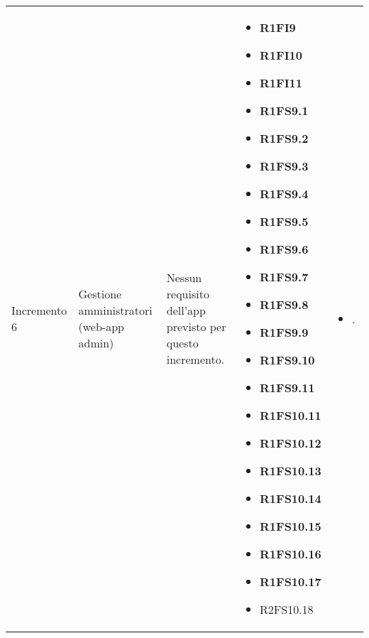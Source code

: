 {\begin{longtable}{C{2.5cm} C{3.2cm} C{2.8cm} C{2.8cm} C{2.8cm}}
Incremento 6 & Gestione amministratori (web-app admin) & 
    Nessun requisito dell'app previsto per questo incremento.
    & \begin{itemize} 
    \item[ ] \textbf{R1FI9}
    \item[ ] \textbf{R1FI10}
    \item[ ] \textbf{R1FI11}
    \item[ ] \textbf{R1FS9.1}
    \item[ ] \textbf{R1FS9.2}
    \item[ ] \textbf{R1FS9.3}
    \item[ ] \textbf{R1FS9.4}
    \item[ ] \textbf{R1FS9.5}
    \item[ ] \textbf{R1FS9.6}
    \item[ ] \textbf{R1FS9.7}
    \item[ ] \textbf{R1FS9.8}
    \item[ ] \textbf{R1FS9.9}
    \item[ ] \textbf{R1FS9.10}
    \item[ ] \textbf{R1FS9.11}
    \item[ ] \textbf{R1FS10.11}
    \item[ ] \textbf{R1FS10.12}
    \item[ ] \textbf{R1FS10.13}
    \item[ ] \textbf{R1FS10.14}
    \item[ ] \textbf{R1FS10.15}
    \item[ ] \textbf{R1FS10.16}
    \item[ ] \textbf{R1FS10.17}
    \item[ ] R2FS10.18
\end{itemize} & \begin{itemize}
    \item[ ] .
\end{itemize}\\

\end{longtable}
}